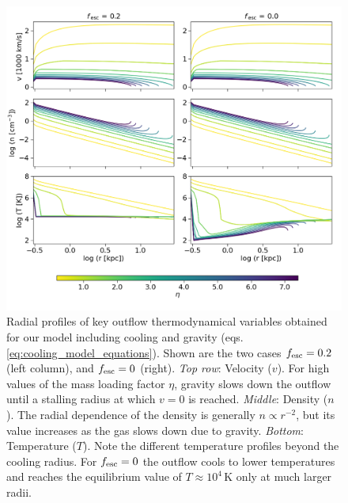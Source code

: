 \begin{figure}
    \centering
    \includegraphics[width=1.\textwidth]{plots/profiles.png}
    \caption{Radial profiles of key outflow thermodynamical variables obtained for our model including cooling and gravity (eqs. \ref{eq:cooling_model_equations}). Shown are the two cases $f_{\rm esc}=0.2$ (left column), and $f_{\rm esc}=0$ (right).
    \textit{Top row}: Velocity ($v$). For high values of the mass loading factor $\eta$, gravity slows down the outflow until a stalling radius at which $v=0$ is reached.
    \textit{Middle}: Density ($n$). The radial dependence of the density is generally $n\propto r^{-2}$, but its value increases as the gas slows down due to gravity.
    \textit{Bottom}: Temperature ($T$). Note the different temperature profiles beyond the cooling radius. For $f_{\rm esc}=0$ the outflow cools to lower temperatures and reaches the equilibrium value of $T\approx10^4\,\mathrm{K}$ only at much larger radii.  
    \label{fig:global_profiles}
    }
\end{figure}

